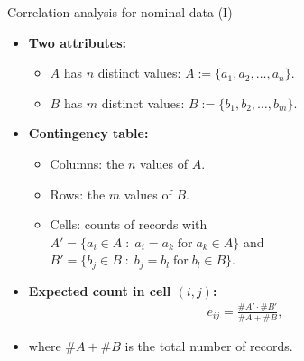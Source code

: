 \documentclass[aspectratio=169,t]{beamer}
\begin{document}
  { 
    \begin{frame}{Correlation analysis for nominal data (I)}
      \begin{itemize}
        \item \textbf{Two attributes:}
        \begin{itemize}
          \item $A$ has $n$ distinct values: $A := \{a_1, a_2, \ldots, a_n\}$.
          \item $B$ has $m$ distinct values: $B := \{b_1, b_2, \ldots, b_m\}$.
        \end{itemize}
        \item \textbf{\color{airforceblue}Contingency table:}
        \begin{itemize}
          \item Columns: the $n$ values of $A$.
          \item Rows: the $m$ values of $B$.
          \item Cells: counts of records with \\
          $A' = \{ a_i \in A \; : \; a_i = a_k \; \text{for} \; a_k \in A\}$ and \\
          $B' = \{ b_j \in B \; : \; b_j = b_l \; \text{for} \; b_l \in B\}$.
        \end{itemize}
        \item \textbf{Expected count in cell $(i,j)$:}
        \begin{align}
          e_{ij} = \frac{\#A' \cdot \#B'}{\#A + \#B},
        \end{align}
        \item where $\#A + \#B$ is the total number of records.
      \end{itemize}
    \end{frame}
  }
\end{document}
